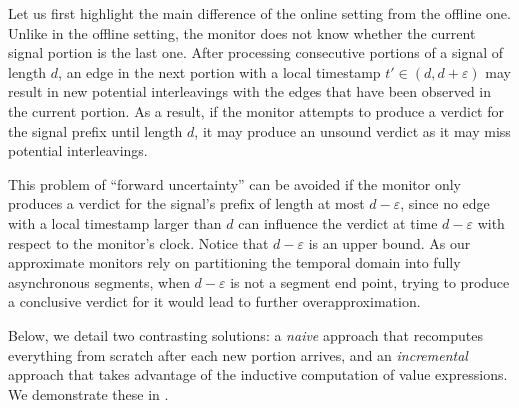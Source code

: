 \documentclass[iicol,lineno]{sn-jnl}
\renewcommand{\cref}{\Cref}
\newcommand{\?}{\text{?}}
\begin{document}
	Let us first highlight the main difference of the online setting from the offline one.
	Unlike in the offline setting, the monitor does not know whether the current signal portion is the last one.
	After processing consecutive portions of a signal of length $d$, an edge in the next portion with a local timestamp $t' \in (d, d+\varepsilon)$ may result in new potential interleavings with the edges that have been observed in the current portion.
	As a result, if the monitor attempts to produce a verdict for the signal prefix until length $d$, it may produce an unsound verdict as it may miss potential interleavings.
	
	This problem of ``forward uncertainty'' can be avoided if the monitor only produces a verdict for the signal's prefix of length at most $d-\varepsilon$, since no edge with a local timestamp larger than $d$ can influence the verdict at time $d-\varepsilon$ with respect to the monitor's clock.
	Notice that $d-\varepsilon$ is an upper bound.
	As our approximate monitors rely on partitioning the temporal domain into fully asynchronous segments, when $d-\varepsilon$ is not a segment end point, trying to produce a conclusive verdict for it would lead to further overapproximation.
	
	Below, we detail two contrasting solutions: a \emph{naive} approach that recomputes everything from scratch after each new portion arrives, and an \emph{incremental} approach that takes advantage of the inductive computation of value expressions.
	We demonstrate these in \cref{fig:online}.
	
\end{document}
